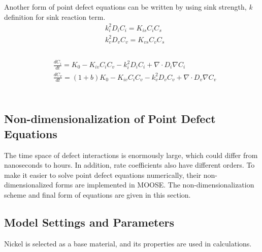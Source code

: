 \documentclass[a4paper]{article}
\begin{document}
Another form of point defect equations can be written by using sink strength, \textit{k} definition for sink reaction term.\\

\begin{equation}
  \begin{aligned}
    &k_i^2D_iC_i = K_{is}C_iC_s \\
    &k_v^2D_vC_v = K_{vs}C_vC_s \\
  \end{aligned}
  \label{equation:sink_reaction_term}
\end{equation}\\
\begin{equation}
  \begin{aligned}
    &\frac{dC_i}{dt} = K_0 - K_{iv}C_iC_v - k_i^2D_iC_i + \nabla\cdot D_i\nabla C_i\\
    &\frac{dC_v}{dt} = (1+b)K_0 - K_{iv}C_iC_v - k_v^2D_vC_v + \nabla\cdot D_v\nabla C_v\\
  \end{aligned}
  \label{equation:point_defect_equations_sink_strength}
\end{equation}\\

\subsection{Non-dimensionalization of Point Defect Equations} \hspace{10pt}
The time space of defect interactions is enormously large, which could differ from nanoseconds to hours. In addition, rate coefficients also have different orders. To make it easier to solve point defect equations numerically, their non-dimensionalized forms are implemented in MOOSE. The non-dimensionalization scheme and final form of equations are given in this section.

\subsection{Model Settings and Parameters} \hspace{10pt}
Nickel is selected as a base material, and its properties are used in calculations.
\end{document}
